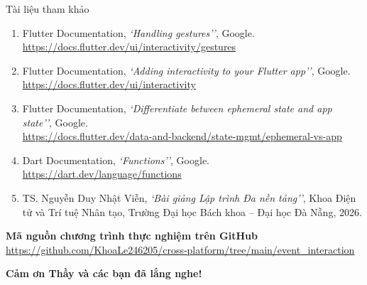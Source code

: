 \documentclass[aspectratio=169, 11pt]{beamer}
\newcommand{\currentsectionname}{}
\newcommand{\setsectionfooter}[1]{\renewcommand{\currentsectionname}{#1}}
\begin{document}
\setsectionfooter{Tài liệu tham khảo}
\begin{frame}{Tài liệu tham khảo}
  \vspace{0.02cm}
  \begin{enumerate}\setlength{\itemsep}{0.10cm}
    \footnotesize
    \item Flutter Documentation, \textit{`Handling gestures''}, Google.\\
          {\color{DarkMain}\url{https://docs.flutter.dev/ui/interactivity/gestures}}
    \item Flutter Documentation, \textit{`Adding interactivity to your Flutter app''}, Google.\\
          {\color{DarkMain}\url{https://docs.flutter.dev/ui/interactivity}}
    \item Flutter Documentation, \textit{`Differentiate between ephemeral state and app state''}, Google.\\
          {\color{DarkMain}\url{https://docs.flutter.dev/data-and-backend/state-mgmt/ephemeral-vs-app}}
    \item Dart Documentation, \textit{`Functions''}, Google.\\
          {\color{DarkMain}\url{https://dart.dev/language/functions}}
    \item TS. Nguyễn Duy Nhật Viễn, \textit{`Bài giảng Lập trình Đa nền tảng''}, Khoa Điện tử và Trí tuệ Nhân tạo, Trường Đại học Bách khoa -- Đại học Đà Nẵng, 2026.
  \end{enumerate}

  \vspace{0.14cm}
  \begin{codepanel}
    {\footnotesize\bfseries\color{TextDark} Mã nguồn chương trình thực nghiệm trên GitHub}\\[1.5pt]
    {\footnotesize\color{DarkMain}\url{https://github.com/KhoaLe246205/cross-platform/tree/main/event_interaction}}
  \end{codepanel}
\end{frame}

\setsectionfooter{}
\begin{frame}
  \vspace{1.95cm}
  \centering
  {\fontsize{19.5pt}{25pt}\selectfont\bfseries\color{DarkMain}
    Cảm ơn Thầy và các bạn đã lắng nghe!\par
  }
\end{frame}
\end{document}
